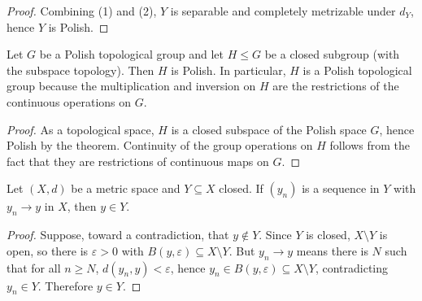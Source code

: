 \begin{theorem}
\begin{itemize}
\begin{mynote}
\begin{proof}
                      \smallskip
                      Combining (1) and (2), $Y$ is separable and completely metrizable under $d_Y$, hence $Y$ is Polish.
                  \end{proof}

                  \begin{corollary}
                      Let $G$ be a Polish topological group and let $H\leq G$ be a closed subgroup (with the subspace topology). Then $H$ is Polish. In particular, $H$ is a Polish topological group because the multiplication and inversion on $H$ are the restrictions of the continuous operations on $G$.
                  \end{corollary}

                  \begin{proof}
                      As a topological space, $H$ is a closed subspace of the Polish space $G$, hence Polish by the theorem. Continuity of the group operations on $H$ follows from the fact that they are restrictions of continuous maps on $G$.
                  \end{proof}

                  \begin{lemma}
                      Let $(X,d)$ be a metric space and $Y\subseteq X$ closed. If $(y_n)$ is a sequence
                      in $Y$ with $y_n\to y$ in $X$, then $y\in Y$.
                  \end{lemma}

                  \begin{proof}
                      Suppose, toward a contradiction, that $y\notin Y$. Since $Y$ is closed,
                      $X\setminus Y$ is open, so there is $\varepsilon>0$ with
                      $B(y,\varepsilon)\subseteq X\setminus Y$. But $y_n\to y$ means there is
                      $N$ such that for all $n\ge N$, $d(y_n,y)<\varepsilon$, hence
                      $y_n\in B(y,\varepsilon)\subseteq X\setminus Y$, contradicting $y_n\in Y$.
                      Therefore $y\in Y$.
                  \end{proof}
              \end{mynote}



\end{itemize}
\end{theorem}
